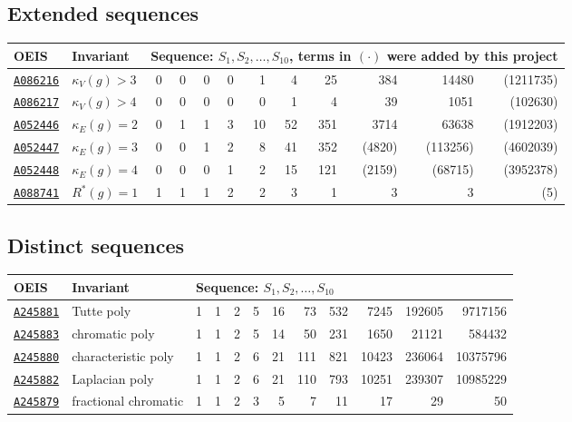 \documentclass[12pt]{article}
\newcommand{\OEIS}[1]
{\href{https://oeis.org/#1}{\texttt{#1}}}
\newcommand{\SEQ}{S}
\newcommand{\VARedgeconnectivity}{\kappa_{E}(g)}
\newcommand{\VARvertexconnectivity}{\kappa_{V}(g)}
\newcommand{\VARstronglyregular}{R^*}
\begin{document}
\begin{appendices}
\newenvironment{invariantTable}[2]
{
  \begin{longtable}{@{\extracolsep{\fill}} #1}
    \toprule
    OEIS & Invariant & #2 \\
    \midrule\bottomrule
}
{
  \end{longtable}
}

\subsection{Extended sequences}
\label{sec:seq_extended}

\begin{invariantTable}{l l r r r r r r r r r r}
{\multicolumn{10}{l}{Sequence: $\SEQ_1, \SEQ_2, \ldots, \SEQ_{10}$, terms in $(\cdot)$ were added by this project}}
\OEIS{A086216} & $\VARvertexconnectivity > 3$ & 0 & 0 & 0 & 0 & 1 & 4 & 25 & 384 & 14480 & (1211735) \\
\OEIS{A086217} & $\VARvertexconnectivity > 4$ & 0 & 0 & 0 & 0 & 0 & 1 & 4 & 39 & 1051 & (102630) \\
\OEIS{A052446} & $\VARedgeconnectivity =2$ & 	0& 1& 1& 3& 10& 52& 351& 3714& 63638& (1912203) \\
\OEIS{A052447} & $\VARedgeconnectivity =3$ & 0& 0& 1& 2& 8& 41& 352& (4820) & (113256) & (4602039) \\
\OEIS{A052448} & $\VARedgeconnectivity =4$ & 	0& 0& 0& 1& 2& 15& 121& (2159) & (68715) & (3952378) \\
\OEIS{A088741} & $\VARstronglyregular(g)=1$ & 	1& 1& 1& 2& 2& 3& 1& 3& 3& (5) \\
\end{invariantTable}

\subsection{Distinct sequences}
\label{sec:seq_distinct}

\begin{invariantTable}{l l r r r r r r r r r r}
{\multicolumn{10}{l}{Sequence: $\SEQ_1, \SEQ_2, \ldots, \SEQ_{10}$}}
\OEIS{A245881} & Tutte poly & 1 & 1 & 2 & 5 & 16 & 73 & 532 & 7245 & 192605 & 9717156 \\
\OEIS{A245883} & chromatic poly & 1 & 1 & 2 & 5 & 14 & 50 & 231 & 1650 & 21121 & 584432 \\
\OEIS{A245880} & characteristic poly & 1 & 1 & 2 & 6 & 21 & 111 & 821 & 10423 & 236064 & 10375796 \\
\OEIS{A245882} & Laplacian poly & 1 & 1 & 2 & 6 & 21 & 110 & 793 & 10251 & 239307 & 10985229 \\
\OEIS{A245879} & fractional chromatic& 1 & 1 & 2 & 3 & 5 & 7 & 11 & 17 & 29 & 50 \\
\end{invariantTable}


\end{appendices}
\end{document}
